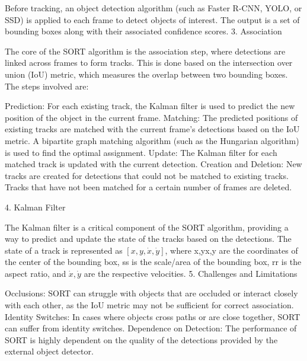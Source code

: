 Before tracking, an object detection algorithm (such as Faster R-CNN, YOLO, or SSD) is applied to each frame to detect objects of interest. The output is a set of bounding boxes along with their associated confidence scores.
3. Association

The core of the SORT algorithm is the association step, where detections are linked across frames to form tracks. This is done based on the intersection over union (IoU) metric, which measures the overlap between two bounding boxes. The steps involved are:

Prediction: For each existing track, the Kalman filter is used to predict the new position of the object in the current frame.
Matching: The predicted positions of existing tracks are matched with the current frame's detections based on the IoU metric. A bipartite graph matching algorithm (such as the Hungarian algorithm) is used to find the optimal assignment.
Update: The Kalman filter for each matched track is updated with the current detection.
Creation and Deletion: New tracks are created for detections that could not be matched to existing tracks. Tracks that have not been matched for a certain number of frames are deleted.

4. Kalman Filter

The Kalman filter is a critical component of the SORT algorithm, providing a way to predict and update the state of the tracks based on the detections. The state of a track is represented as $[x,y,\dot{x},\dot{y}]$, where x,yx,y are the coordinates of the center of the bounding box, ss is the scale/area of the bounding box, rr is the aspect ratio, and $\dot{x},\dot{y}$ are the respective velocities.
5. Challenges and Limitations

Occlusions: SORT can struggle with objects that are occluded or interact closely with each other, as the IoU metric may not be sufficient for correct association.
Identity Switches: In cases where objects cross paths or are close together, SORT can suffer from identity switches.
Dependence on Detection: The performance of SORT is highly dependent on the quality of the detections provided by the external object detector.




